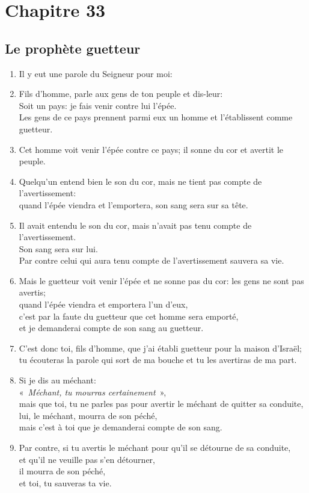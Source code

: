 \section*{Chapitre 33}
\subsection*{Le prophète guetteur}
\begin{enumerate}[leftmargin=\psleftmargin, labelsep = \pslabelsep, label={\arabic*}, font=\color{\pscolor}\small\textsuperscript, parsep=0em, itemsep=0em, topsep=0em ]
    \item Il y eut une parole du Seigneur pour moi:
    \item Fils d’homme, parle aux gens de ton peuple et dis-leur: \\ Soit un pays: je fais venir contre lui l’épée.\\ Les gens de ce pays prennent parmi eux un homme et l’établissent comme guetteur.
    \item Cet homme voit venir l’épée contre ce pays; il sonne du cor et avertit le peuple.
    \item Quelqu’un entend bien le son du cor, mais ne tient pas compte de l’avertissement: \\ quand l’épée viendra et l’emportera, son sang sera sur sa tête.
    \item Il avait entendu le son du cor, mais n’avait pas tenu compte de l’avertissement. \\ Son sang sera sur lui. \\ Par contre celui qui aura tenu compte de l’avertissement sauvera sa vie.
    \item Mais le guetteur voit venir l’épée et ne sonne pas du cor: les gens ne sont pas avertis; \\ quand l’épée viendra et emportera l’un d’eux, \\ c’est par la faute du guetteur que cet homme sera emporté,
          \\ et je demanderai compte de son sang au guetteur. \parSpace

    \item C’est donc toi, fils d’homme, que j’ai établi guetteur pour la maison d’Israël;\\ tu écouteras la parole qui sort de ma bouche et tu les avertiras de ma part.
    \item Si je dis au méchant: \\ \decalage «~\textit{Méchant, tu mourras certainement}~»,\\ mais que toi, tu ne parles pas pour avertir le méchant de quitter sa conduite, \\ lui, le méchant, mourra de son péché, \\ mais c’est à toi que je demanderai compte de son sang.
    \item Par contre, si tu avertis le méchant pour qu’il se détourne de sa conduite, \\ et qu’il ne veuille pas s’en détourner, \\ il mourra de son péché, \\ et toi, tu sauveras ta vie. \parSpace


\end{enumerate}
